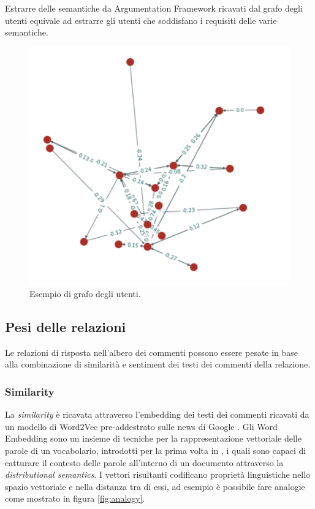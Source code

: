 Estrarre delle semantiche da Argumentation Framework ricavati dal grafo degli utenti equivale ad estrarre gli utenti che soddisfano i requisiti delle varie semantiche.


\begin{figure}[h]
    \includegraphics[width=\linewidth]{Immagini/users-graph.png}
    \caption{Esempio di grafo degli utenti.}
    \label{fig:users-graph}
\end{figure}

\subsection{Pesi delle relazioni}
\label{subsection:weight}
Le relazioni di risposta nell'albero dei commenti possono essere pesate in base alla combinazione di similarità e sentiment dei testi dei commenti della relazione.

\subsubsection{Similarity}
La \textit{similarity} è ricavata attraverso l'embedding dei testi dei commenti ricavati da un modello di Word2Vec pre-addestrato sulle news di Google \cite{googlenewsmodel}. Gli Word Embedding sono un insieme di tecniche per la rappresentazione vettoriale delle parole di un vocabolario, introdotti per la prima volta in \cite{mikolov2013distributed}, i quali sono capaci di catturare il contesto delle parole all'interno di un documento attraverso la \textit{distributional semantics}. I vettori risultanti codificano proprietà linguistiche nello spazio vettoriale e nella distanza tra di essi, ad esempio è possibile fare analogie come mostrato in figura \ref{fig:analogy}.

